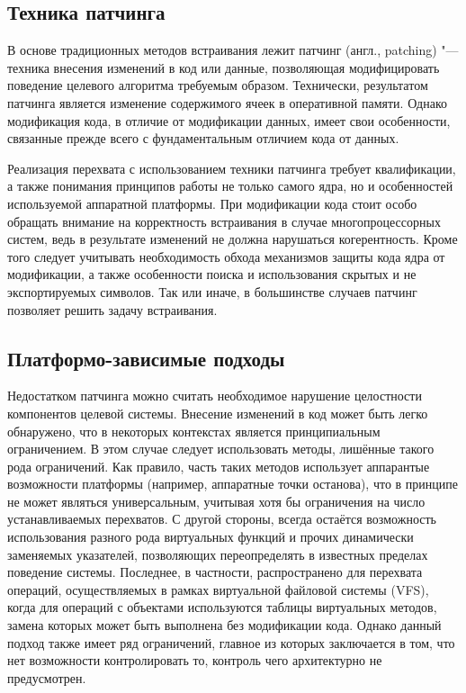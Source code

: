 \documentclass[10pt, a5paper]{article}
\begin{document}
\subsection*{Техника патчинга}

В основе традиционных методов встраивания лежит патчинг (англ., patching) "--- техника внесения изменений в код или данные, позволяющая модифицировать поведение целевого алгоритма требуемым образом. Технически, результатом патчинга является изменение содержимого ячеек в оперативной памяти. Однако модификация кода, в отличие от модификации данных, имеет свои особенности, связанные прежде всего с фундаментальным отличием кода от данных.

Реализация перехвата с использованием техники патчинга требует квалификации, а также понимания принципов работы не только самого ядра, но и особенностей используемой аппаратной платформы. При модификации кода стоит особо обращать внимание на корректность встраивания в случае многопроцессорных систем, ведь в результате изменений не должна нарушаться когерентность. Кроме того следует учитывать необходимость обхода механизмов защиты кода ядра от модификации, а также особенности поиска и использования скрытых и не экспортируемых символов. Так или иначе, в большинстве случаев патчинг позволяет решить задачу встраивания.

\subsection*{Платформо-зависимые подходы}

Недостатком патчинга можно считать необходимое нарушение целостности компонентов целевой системы. Внесение изменений в код может быть легко обнаружено, что в некоторых контекстах является принципиальным ограничением. В этом случае следует использовать методы, лишённые такого рода ограничений. Как правило, часть таких методов использует аппарантые возможности платформы (например, аппаратные точки останова), что в принципе не может являться универсальным, учитывая хотя бы ограничения на число устанавливаемых перехватов. С другой стороны, всегда остаётся возможность использования разного рода виртуальных функций и прочих динамически заменяемых указателей, позволяющих переопределять в известных пределах поведение системы. Последнее, в частности, распространено для перехвата операций, осуществляемых в рамках виртуальной файловой системы (VFS), когда для операций с объектами используются таблицы виртуальных методов, замена которых может быть выполнена без модификации кода. Однако данный подход также имеет ряд ограничений, главное из которых заключается в том, что нет возможности контролировать то, контроль чего архитектурно не предусмотрен.
\end{document}
